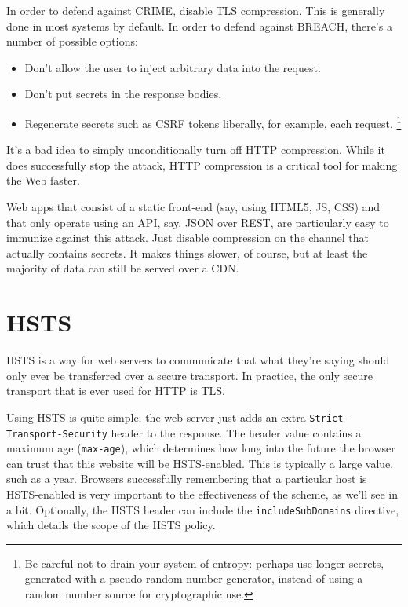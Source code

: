 \documentclass[11pt,ebook,table,dvipsnames]{memoir}
\begin{document}
In order to defend against \hyperref[CRIME]{CRIME}, disable TLS compression. This is
generally done in most systems by default. In order to defend against
BREACH, there's a number of possible options:

\begin{itemize}
\item Don't allow the user to inject arbitrary data into the request.
\item Don't put secrets in the response bodies.
\item Regenerate secrets such as CSRF tokens liberally, for example, each
request. \footnote{Be careful not to drain your system of entropy: perhaps
   use longer secrets, generated with a pseudo-random number
   generator, instead of using a random number source for
   cryptographic use.}
\end{itemize}

It's a bad idea to simply unconditionally turn off HTTP compression.
While it does successfully stop the attack, HTTP compression is a
critical tool for making the Web faster.

Web apps that consist of a static front-end (say, using HTML5, JS,
CSS) and that only operate using an API, say, JSON over REST, are
particularly easy to immunize against this attack. Just disable
compression on the channel that actually contains secrets. It makes
things slower, of course, but at least the majority of data can still
be served over a CDN.
\section{HSTS}
\label{sec-3-1-9}

\Gls{HSTS} is a way for web servers to communicate that what they're
saying should only ever be transferred over a secure transport. In
practice, the only secure transport that is ever used for HTTP is TLS.

Using HSTS is quite simple; the web server just adds an extra
\verb~Strict-Transport-Security~ header to the response. The header value
contains a maximum age (\verb~max-age~), which determines how long into the
future the browser can trust that this website will be HSTS-enabled.
This is typically a large value, such as a year. Browsers successfully
remembering that a particular host is HSTS-enabled is very important
to the effectiveness of the scheme, as we'll see in a bit. Optionally,
the HSTS header can include the \verb~includeSubDomains~ directive, which
details the scope of the HSTS policy. \cite{hsts}
\end{document}

